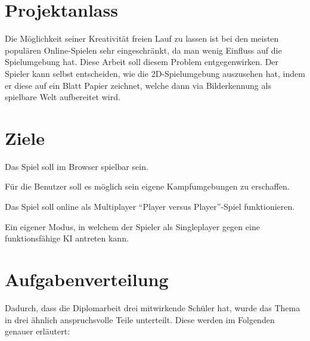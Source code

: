 \section{Projektanlass}
Die Möglichkeit seiner Kreativität freien Lauf zu lassen ist bei den meisten populären
Online-Spielen sehr eingeschränkt, da man wenig Einfluss auf die Spielumgebung hat.
Diese Arbeit soll diesem Problem entgegenwirken. Der Spieler kann selbst entscheiden,
wie die 2D-Spielumgebung auszusehen hat, indem er diese auf ein Blatt Papier zeichnet,
welche dann via Bilderkennung als spielbare Welt aufbereitet wird.

\section{Ziele}
\begin{compactitem}
    \item Das Spiel soll im Browser spielbar sein.
    \item Für die Benutzer soll es möglich sein eigene Kampfumgebungen zu erschaffen.
    \item Das Spiel soll online als Multiplayer ``Player versus Player''-Spiel funktionieren.
    \item Ein eigener Modus, in welchem der Spieler als Singleplayer gegen eine funktionsfähige KI antreten kann.
\end{compactitem}

\section{Aufgabenverteilung}
Dadurch, dass die Diplomarbeit drei mitwirkende Schüler hat, wurde das Thema in drei ähnlich
anspruchsvolle Teile unterteilt. Diese werden im Folgenden genauer erläutert:


